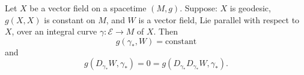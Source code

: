 Let $X$ be a vector field on a spacetime $(M, g)$. Suppose: $X$ is geodesic, $g(X, X)$ is constant on $M$, and $W$ is a vector field, Lie parallel with respect to $X$, over an integral curve $\gamma: \mathcal{E} \rightarrow M$ of $X$. Then
$$g(\gamma_*, W) = \text{constant}$$
and
$$g(D_{\gamma_*} W, \gamma_*) = 0 = g(D_{\gamma_*} D_{\gamma_*} W, \gamma_*).$$
